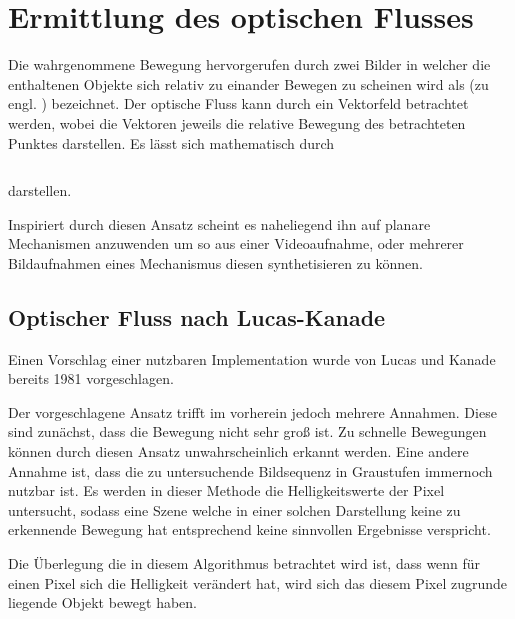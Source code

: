 
\chapter{Ermittlung des optischen Flusses}

Die wahrgenommene Bewegung hervorgerufen durch zwei Bilder in welcher die enthaltenen Objekte sich relativ zu einander Bewegen zu scheinen wird als (zu engl. ) bezeichnet. %
Der optische Fluss kann durch ein Vektorfeld betrachtet werden, wobei die Vektoren jeweils die relative Bewegung des betrachteten Punktes darstellen.
Es lässt sich mathematisch durch

\begin{equation}
\label{eq:optical_flow}
\end{equation}

darstellen.


Inspiriert durch diesen Ansatz scheint es naheliegend ihn auf planare Mechanismen anzuwenden um so aus einer Videoaufnahme, oder mehrerer Bildaufnahmen eines Mechanismus diesen synthetisieren zu können.


\section{Optischer Fluss nach Lucas-Kanade}\label{ch:lucas_kanade}

Einen Vorschlag einer nutzbaren Implementation wurde von Lucas und Kanade bereits 1981 vorgeschlagen. %

Der vorgeschlagene Ansatz trifft im vorherein jedoch mehrere Annahmen.
Diese sind zunächst, dass die Bewegung nicht sehr groß ist.
Zu schnelle Bewegungen können durch diesen Ansatz unwahrscheinlich erkannt werden.
Eine andere Annahme ist, dass die zu untersuchende Bildsequenz in Graustufen immernoch nutzbar ist.
Es werden in dieser Methode die Helligkeitswerte der Pixel untersucht, sodass eine Szene welche in einer solchen Darstellung keine zu erkennende Bewegung hat entsprechend keine sinnvollen Ergebnisse verspricht.

Die Überlegung die in diesem Algorithmus betrachtet wird ist, dass wenn für einen Pixel sich die Helligkeit verändert hat, wird sich das diesem Pixel zugrunde liegende Objekt bewegt haben.

